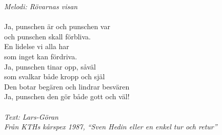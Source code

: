 {\footnotesize\textit{Melodi: Rövarnas visan}}\\
\\
Ja, punschen är och punschen var\\
och punschen skall förbliva.\\
En lidelse vi alla har\\
som inget kan fördriva.\\
Ja, punschen tinar opp, såväl\\
som svalkar både kropp och själ\\
Den botar begären och lindrar besvären\\
Ja, punschen den gör både gott och väl!\\
\\
{\footnotesize\textit{Text: Lars-Göran\\
Från KTHs kårspex 1987, ``Sven Hedin eller en enkel tur och retur''}}
